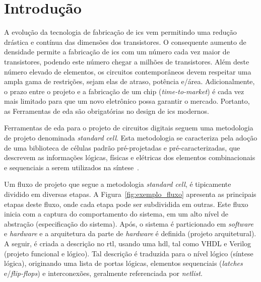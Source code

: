\chapter{Introdução}
\label{cap:introducao}

A evolução da tecnologia de fabricação de \acp{ic} vem permitindo uma redução drástica e contínua das dimensões dos transistores.
O consequente aumento de densidade permite a fabricação de \acp{ic} com um número cada vez maior de transistores, podendo este número chegar a milhões de transistores.
Além deste número elevado de elementos, os circuitos contemporâneos devem respeitar uma ampla gama de restrições, sejam elas de atraso, potência e\@/\@ou área.
Adicionalmente, o prazo entre o projeto e a fabricação de um chip (\textit{time-to-market}) é cada vez mais limitado para que um novo eletrônico possa garantir o mercado.
Portanto, as Ferramentas de \ac{eda} são obrigatórias no design de \acp{ic} modernos.

Ferramentas de \ac{eda} para o projeto de circuitos digitais seguem uma metodologia de projeto denominada \textit{standard cell}.
Esta metodologia se caracteriza pela adoção de uma biblioteca de células padrão pré-projetadas e pré-caracterizadas, que descrevem as informações lógicas, físicas e elétricas dos elementos combinacionais e sequenciais a serem utilizados na síntese~\cite{kahng2011vlsi}.

Um fluxo de projeto que segue a metodologia \textit{standard cell}, é tipicamente dividido em diversas etapas.
A Figura~\ref{fig:exemplo_fluxo} apresenta as principais etapas deste fluxo, onde cada etapa pode ser subdividida em outras.
Este fluxo inicia com a captura do comportamento do sistema, em um alto nível de abstração (especificação do sistema).
Após, o sistema é particionado em \textit{software} e \textit{hardware} e a arquitetura da parte de \textit{hardware} é definida (projeto arquitetural).
A seguir, é criada a descrição no \ac{rtl}, usando uma \ac{hdl}, tal como VHDL e Verilog (projeto funcional e lógico).
Tal descrição é traduzida para o nível lógico (síntese lógica), originando uma lista de portas lógicas, elementos sequenciais (\textit{latches} e\@/\@ou \textit{flip-flops}) e interconexões, geralmente referenciada por \textit{netlist}.

